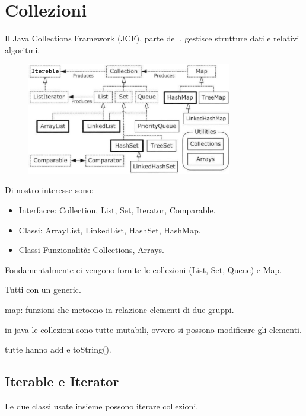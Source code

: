 \section{Collezioni}
Il Java Collections Framework (JCF), parte del , gestisce strutture dati e relativi algoritmi.
\begin{figure}[h]
	\centering
	\includegraphics[width=0.8\textwidth]{JCF.png}
\end{figure}

Di nostro interesse sono:
\begin{itemize}
	\item Interfacce: Collection, List, Set, Iterator, Comparable.
	\item Classi: ArrayList, LinkedList, HashSet, HashMap.
	\item Classi Funzionalità: Collections, Arrays.
\end{itemize}

Fondamentalmente ci vengono fornite le collezioni (List, Set, Queue) e Map.

Tutti con un generic.

map: funzioni che metoono in relazione elementi di due gruppi.

in java le collezioni sono tutte mutabili, ovvero si possono modificare gli elementi.

tutte hanno add e toString().

\subsection{Iterable e Iterator}


Le due classi usate insieme possono iterare collezioni.


